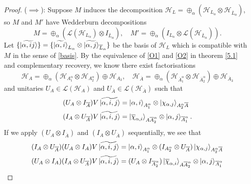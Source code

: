 \documentclass[12pt,a4paper]{report}
\numberwithin{equation}{section}
\newcommand{\ol}[1]{\overline{#1}}
\theoremstyle{definition}
\theoremstyle{theorem}
\theoremstyle{theorem}
\theoremstyle{example}
\theoremstyle{definition}
\begin{document}
\begin{proof}
	($\implies$): Suppose $M$ induces the decomposition $\mathcal{H}_{L}=\oplus_{\alpha}(\mathcal{H}_{L_{\alpha}}\otimes\mathcal{H}_{\ol{L}_{\alpha}})$, so $M$ and $M'$ have Wedderburn decompositions
	\begin{equation}
		M=\oplus_{\alpha}(\mathcal{L}(\mathcal{H}_{L_{\alpha}})\otimes I_{\ol{L}_{\alpha}}),\quad M'=\oplus_{\alpha}(I_{L_{\alpha}}\otimes\mathcal{L}(\mathcal{H}_{\ol{L}_{\alpha}})).
	\end{equation}
	Let $\{\ket{\widetilde{\alpha,ij}}\}=\{\ket{\widetilde{\alpha,i}}_{L_{\alpha}}\otimes\ket{\widetilde{\alpha,j}}_{\ol{L}_{\alpha}}\}$ be the basis of $\mathcal{H}_{L}$ which is compatible with $M$ in the sense of \ref{basis}. By the equivalence of \ref{O1} and \ref{O2} in theorem \ref{5.1} and complementary recovery, we know there exist factorisations
	\begin{equation}
		\mathcal{H}_{A}=\oplus_{\alpha}(\mathcal{H}_{A_{1}^{\alpha}}\otimes\mathcal{H}_{A_{2}^{\alpha}})\oplus\mathcal{H}_{A_{3}},\quad\mathcal{H}_{\ol{A}}=\oplus_{\alpha}(\mathcal{H}_{\ol{A}_{1}^{\alpha}}\otimes\mathcal{H}_{\ol{A}_{2}^{\alpha}})\oplus\mathcal{H}_{\ol{A}_{3}}
	\end{equation}
	and unitaries $U_{A}\in\mathcal{L}(\mathcal{H}_{A})$ and $U_{\ol{A}}\in\mathcal{L}(\mathcal{H}_{\ol{A}})$ such that
	\begin{equation}
		\begin{aligned}
			(U_{A}\otimes I_{\ol{A}})V\ket{\widetilde{\alpha,i,j}}&=\ket{\alpha,i}_{A_{1}^{\alpha}}\otimes\ket{\chi_{\alpha,j}}_{A_{2}^{\alpha}\ol{A}}\\
			(I_{A}\otimes U_{\ol{A}})V\ket{\widetilde{\alpha,i,j}}&=\ket{\ol{\chi}_{\alpha,i}}_{A\ol{A}_{2}^{\alpha}}\otimes\ket{\alpha,j}_{\ol{A}_{1}^{\alpha}}.
		\end{aligned}
	\end{equation}
	If we apply $(U_{A}\otimes I_{\ol{A}})$ and $(I_{A}\otimes U_{\ol{A}})$ sequentially, we see that
	\begin{equation}
		\begin{aligned}
			(I_{A}\otimes U_{\ol{A}})(U_{A}\otimes I_{A})V\ket{\widetilde{\alpha,i,j}}&=\ket{\alpha,i}_{A_{1}^{\alpha}}\otimes(I_{A_{2}^{\alpha}}\otimes U_{\ol{A}})\ket{\chi_{\alpha,j}}_{A_{2}^{\alpha}\ol{A}}\\
			(U_{A}\otimes I_{A})(I_{A}\otimes U_{\ol{A}})V\ket{\widetilde{\alpha,i,j}}&=(U_{A}\otimes I_{\ol{A}_{2}^{\alpha}})\ket{\ol{\chi}_{\alpha,i}}_{A\ol{A}_{2}^{\alpha}}\otimes\ket{\alpha,j}_{\ol{A}_{1}^{\alpha}}

\end{aligned}
\end{equation}
\end{proof}
\end{document}
